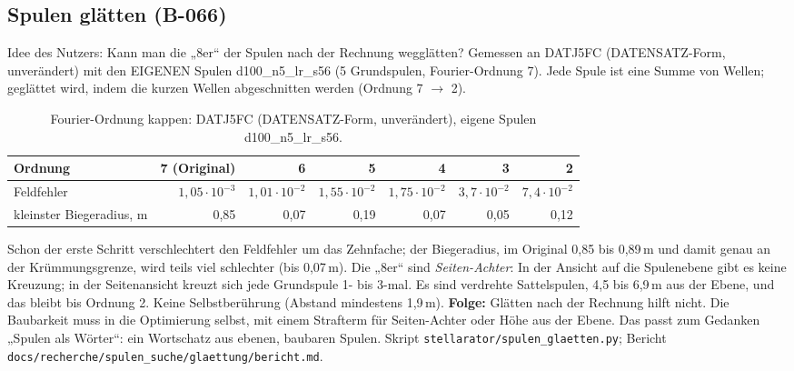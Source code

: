 \subsection{Spulen glätten (B-066)}
Idee des Nutzers: Kann man die „8er“ der Spulen nach der Rechnung wegglätten? Gemessen an DATJ5FC (DATENSATZ-Form, unverändert) mit den EIGENEN Spulen d100\_n5\_lr\_s56 (5 Grundspulen, Fourier-Ordnung 7). Jede Spule ist eine Summe von Wellen; geglättet wird, indem die kurzen Wellen abgeschnitten werden (Ordnung 7 $\to$ 2).
\begin{table}[H]\centering\small
\begin{tabular}{lrrrrrr}\toprule
Ordnung & 7 (Original) & 6 & 5 & 4 & 3 & 2 \\\midrule
Feldfehler & $1{,}05\cdot10^{-3}$ & $1{,}01\cdot10^{-2}$ & $1{,}55\cdot10^{-2}$ & $1{,}75\cdot10^{-2}$ & $3{,}7\cdot10^{-2}$ & $7{,}4\cdot10^{-2}$ \\
kleinster Biegeradius, m & 0,85 & 0,07 & 0,19 & 0,07 & 0,05 & 0,12 \\\bottomrule
\end{tabular}\caption{Fourier-Ordnung kappen: DATJ5FC (DATENSATZ-Form, unverändert), eigene Spulen d100\_n5\_lr\_s56.}\end{table}
Schon der erste Schritt verschlechtert den Feldfehler um das Zehnfache; der Biegeradius, im Original 0,85 bis 0,89\,m und damit genau an der Krümmungsgrenze, wird teils viel schlechter (bis 0,07\,m).
Die „8er“ sind \emph{Seiten-Achter}: In der Ansicht auf die Spulenebene gibt es keine Kreuzung; in der Seitenansicht kreuzt sich jede Grundspule 1- bis 3-mal. Es sind verdrehte Sattelspulen, 4,5 bis 6,9\,m aus der Ebene, und das bleibt bis Ordnung 2. Keine Selbstberührung (Abstand mindestens 1,9\,m).
\textbf{Folge:} Glätten nach der Rechnung hilft nicht. Die Baubarkeit muss in die Optimierung selbst, mit einem Strafterm für Seiten-Achter oder Höhe aus der Ebene. Das passt zum Gedanken „Spulen als Wörter“: ein Wortschatz aus ebenen, baubaren Spulen. Skript \texttt{stellarator/spulen\_glaetten.py}; Bericht \texttt{docs/recherche/\allowbreak spulen\_suche/\allowbreak glaettung/\allowbreak bericht.md}.

